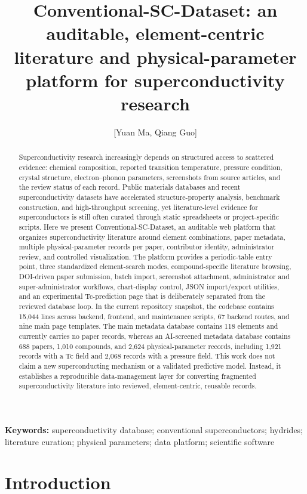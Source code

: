 \documentclass[11pt,a4paper]{article}
\title{Conventional-SC-Dataset: an auditable, element-centric literature and physical-parameter platform for superconductivity research}
\author[1]{[Yuan Ma, Qiang Guo]}
\affil[1]{[Your Affiliation]}
\date{}
\begin{document}
\maketitle

\begin{abstract}
Superconductivity research increasingly depends on structured access to scattered evidence: chemical composition, reported transition temperature, pressure condition, crystal structure, electron--phonon parameters, screenshots from source articles, and the review status of each record. Public materials databases and recent superconductivity datasets have accelerated structure-property analysis, benchmark construction, and high-throughput screening, yet literature-level evidence for superconductors is still often curated through static spreadsheets or project-specific scripts. Here we present Conventional-SC-Dataset, an auditable web platform that organizes superconductivity literature around element combinations, paper metadata, multiple physical-parameter records per paper, contributor identity, administrator review, and controlled visualization. The platform provides a periodic-table entry point, three standardized element-search modes, compound-specific literature browsing, DOI-driven paper submission, batch import, screenshot attachment, administrator and super-administrator workflows, chart-display control, JSON import/export utilities, and an experimental Tc-prediction page that is deliberately separated from the reviewed database loop. In the current repository snapshot, the codebase contains 15,044 lines across backend, frontend, and maintenance scripts, 67 backend routes, and nine main page templates. The main metadata database contains 118 elements and currently carries no paper records, whereas an AI-screened metadata database contains 688 papers, 1,010 compounds, and 2,624 physical-parameter records, including 1,921 records with a Tc field and 2,068 records with a pressure field. This work does not claim a new superconducting mechanism or a validated predictive model. Instead, it establishes a reproducible data-management layer for converting fragmented superconductivity literature into reviewed, element-centric, reusable records.
\end{abstract}

\noindent\textbf{Keywords:} superconductivity database; conventional superconductors; hydrides; literature curation; physical parameters; data platform; scientific software

\section{Introduction}
\end{document}
